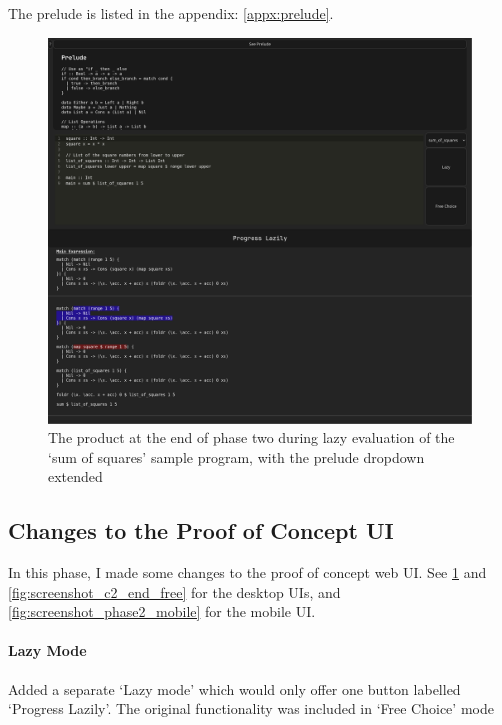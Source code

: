 The prelude is listed in the appendix: \ref{appx:prelude}.

\begin{figure}[h]
    \centering
    \includegraphics[width=1\linewidth]{images/phase-2-end2.png} 
    \captionsetup{justification=centering}
    \caption{The product at the end of phase two during lazy evaluation of the `sum of squares' sample program, with the prelude dropdown extended}
    \label{fig:screenshot_c2_end}
\end{figure}


\subsection{Changes to the Proof of Concept UI}
\label{c2_poc_ui_impl}
In this phase, I made some changes to the proof of concept web UI. See \ref{fig:screenshot_c2_end} and \ref{fig:screenshot_c2_end_free} for the desktop UIs, and \ref{fig:screenshot_phase2_mobile} for the mobile UI. 

\paragraph{Lazy Mode}
Added a separate `Lazy mode' which would only offer one button labelled `Progress Lazily'. The original functionality was included in `Free Choice' mode

